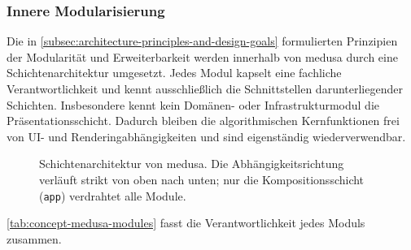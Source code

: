             \subsubsection{Innere Modularisierung}\label{subsubsec:concept-medusa-modularization} 
                Die in \cref{subsec:architecture-principles-and-design-goals} formulierten Prinzipien der Modularität und Erweiterbarkeit werden innerhalb von \ac{medusa} durch eine Schichtenarchitektur umgesetzt.
                Jedes Modul kapselt eine fachliche Verantwortlichkeit und kennt ausschließlich die Schnittstellen darunterliegender Schichten.
                Insbesondere kennt kein Domänen- oder Infrastrukturmodul die Präsentationsschicht.
                Dadurch bleiben die algorithmischen Kernfunktionen frei von UI- und Renderingabhängigkeiten und sind eigenständig wiederverwendbar.

                \begin{figure}[ht]
                    \centering
                    \resizebox{\linewidth}{!}{
                        
                    }
                    \caption[Schichtenarchitektur der MEDUSA-Module]{
                        Schichten\-architektur von \ac{medusa}.
                        Die Abhängigkeits\-richtung verläuft strikt von oben nach unten; nur die Kompositions\-schicht (\texttt{app}) verdrahtet alle Module.
                    }
                    \label{fig:concept-medusa-layered-architecture}
                \end{figure}

                \cref{tab:concept-medusa-modules} fasst die Verantwortlichkeit jedes Moduls zusammen.

